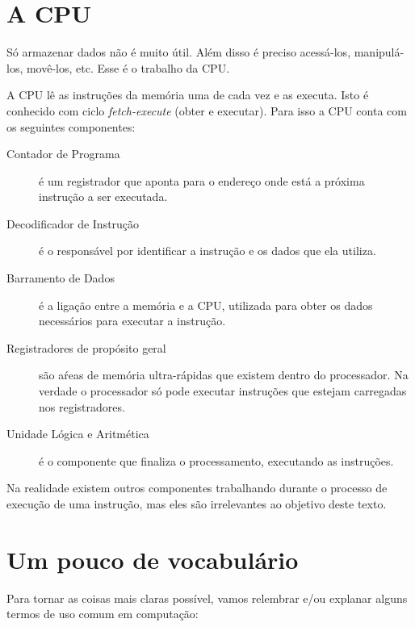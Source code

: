\section{A CPU}

Só armazenar dados não é muito útil. Além disso é preciso acessá-los, manipulá-los, movê-los, etc. Esse é o trabalho da CPU.

A CPU lê as instruções da memória uma de cada vez e as executa. Isto é conhecido com ciclo \emph{fetch-execute} (obter e executar). Para isso a CPU conta com os seguintes componentes:

\begin{description}

\item[Contador de Programa] é um registrador que aponta para o endereço onde está a próxima instrução a ser executada.

\item[Decodificador de Instrução] é o responsável por identificar a instrução e os dados que ela utiliza.

\item[Barramento de Dados] é a ligação entre a memória e a CPU, utilizada para obter os dados necessários para executar a instrução.

\item[Registradores de propósito geral] são aŕeas de memória ultra-rápidas que existem dentro do processador. Na verdade o processador só pode executar instruções que estejam carregadas nos registradores.

\item[Unidade Lógica e Aritmética] é o componente que finaliza o processamento, executando as instruções.
\end{description}

Na realidade existem outros componentes trabalhando durante o processo de execução de uma instrução, mas eles são irrelevantes ao objetivo deste texto.

\section{Um pouco de vocabulário}

Para tornar as coisas mais claras possível, vamos relembrar e/ou explanar alguns termos de uso comum em computação:

